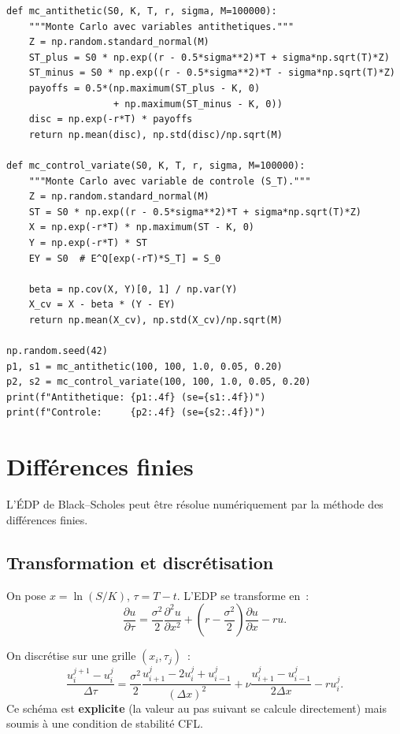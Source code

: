 \begin{codeblock}[title=\textbf{Monte Carlo avec r\'eduction de variance}]
\begin{verbatim}
def mc_antithetic(S0, K, T, r, sigma, M=100000):
    """Monte Carlo avec variables antithetiques."""
    Z = np.random.standard_normal(M)
    ST_plus = S0 * np.exp((r - 0.5*sigma**2)*T + sigma*np.sqrt(T)*Z)
    ST_minus = S0 * np.exp((r - 0.5*sigma**2)*T - sigma*np.sqrt(T)*Z)
    payoffs = 0.5*(np.maximum(ST_plus - K, 0)
                   + np.maximum(ST_minus - K, 0))
    disc = np.exp(-r*T) * payoffs
    return np.mean(disc), np.std(disc)/np.sqrt(M)

def mc_control_variate(S0, K, T, r, sigma, M=100000):
    """Monte Carlo avec variable de controle (S_T)."""
    Z = np.random.standard_normal(M)
    ST = S0 * np.exp((r - 0.5*sigma**2)*T + sigma*np.sqrt(T)*Z)
    X = np.exp(-r*T) * np.maximum(ST - K, 0)
    Y = np.exp(-r*T) * ST
    EY = S0  # E^Q[exp(-rT)*S_T] = S_0

    beta = np.cov(X, Y)[0, 1] / np.var(Y)
    X_cv = X - beta * (Y - EY)
    return np.mean(X_cv), np.std(X_cv)/np.sqrt(M)

np.random.seed(42)
p1, s1 = mc_antithetic(100, 100, 1.0, 0.05, 0.20)
p2, s2 = mc_control_variate(100, 100, 1.0, 0.05, 0.20)
print(f"Antithetique: {p1:.4f} (se={s1:.4f})")
print(f"Controle:     {p2:.4f} (se={s2:.4f})")
\end{verbatim}
\end{codeblock}

\section{Diff\'erences finies}

L'\'EDP de Black--Scholes peut \^etre r\'esolue num\'eriquement par
la m\'ethode des diff\'erences finies.

\subsection{Transformation et discr\'etisation}

On pose $x = \ln(S/K)$, $\tau = T - t$. L'EDP se transforme en~:
\[
    \frac{\partial u}{\partial\tau} = \frac{\sigma^2}{2}
    \frac{\partial^2 u}{\partial x^2}
    + \left(r - \frac{\sigma^2}{2}\right)\frac{\partial u}{\partial x} - ru.
\]

\begin{definition}
On discr\'etise sur une grille $(x_i, \tau_j)$~:
\[
    \frac{u_i^{j+1} - u_i^j}{\Delta\tau}
    = \frac{\sigma^2}{2}\frac{u_{i+1}^j - 2u_i^j + u_{i-1}^j}{(\Delta x)^2}
    + \nu\frac{u_{i+1}^j - u_{i-1}^j}{2\Delta x} - ru_i^j.
\]
Ce sch\'ema est \textbf{explicite} (la valeur au pas suivant se calcule
directement) mais soumis \`a une condition de stabilit\'e CFL.
\end{definition}

